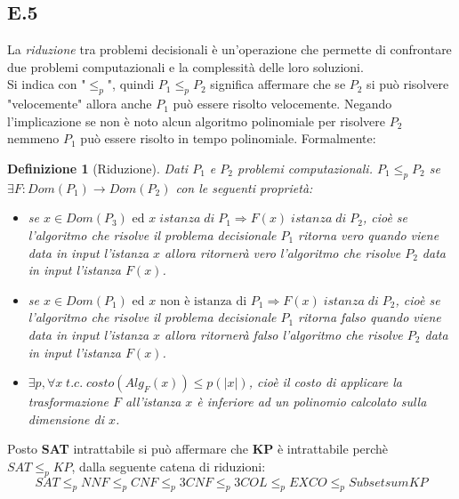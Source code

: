 \documentclass[a4paper]{article}
\newtheorem*{definition}{Definizione}
\newcommand{\red}{\leq_p}
\begin{document}
\subsection{E.5}
La \textit{riduzione} tra problemi decisionali è un'operazione che permette di confrontare due problemi computazionali e la complessità delle loro soluzioni.\\
Si indica con "$\leq_p$", quindi $P_1 \leq_p P_2$ significa affermare che se $P_2$ si può risolvere "velocemente" allora anche $P_1$ può essere risolto velocemente.
Negando l'implicazione se non è noto alcun algoritmo polinomiale per risolvere $P_2$ nemmeno $P_1$ può essere risolto in tempo polinomiale.
Formalmente:
\begin{definition}[Riduzione]
	Dati $P_1$ e $P_2$ problemi computazionali. $P_1 \red P_2$ se $\exists F: Dom(P_1) \rightarrow Dom(P_2)$ con le seguenti proprietà:
	\begin{itemize}
		\item se $x \in Dom(P_3) \text{ ed } x \; istanza \; di \; P_1 \Rightarrow F(x) \; istanza \; di \; P_2$, cioè se l'algoritmo che risolve il problema decisionale $P_1$ ritorna \textit{vero} quando viene data in input l'istanza $x$ allora ritornerà \textit{vero} l'algoritmo che risolve $P_2$ data in input l'istanza $F(x)$.
		\item se $x \in Dom(P_1) \text{ ed } x \text{ non è istanza di }P_1 \Rightarrow F(x) \; istanza \; di \; P_2$, cioè se l'algoritmo che risolve il problema decisionale $P_1$ ritorna \textit{falso} quando viene data in input l'istanza $x$ allora ritornerà \textit{falso} l'algoritmo che risolve $P_2$ data in input l'istanza $F(x)$.
		\item $\exists p, \forall x \; t.c. \; costo(Alg_F(x))\leq p(\lvert x \rvert)$, cioè il costo di applicare la trasformazione $F$ all'istanza $x$ è inferiore ad un polinomio calcolato sulla dimensione di $x$.
	\end{itemize}
\end{definition}
Posto \textbf{SAT} intrattabile si può affermare che \textbf{KP} è intrattabile perchè $SAT \red KP$, dalla seguente catena di riduzioni:
$$ SAT \red NNF \red CNF \red 3CNF \red 3COL \red EXCO \red Subsetsum KP$$
\end{document}
